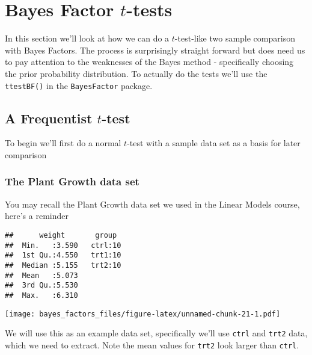 \documentclass[
]{book}
\newenvironment{Shaded}{\begin{snugshade}}{\end{snugshade}}
\newcommand{\KeywordTok}[1]{\textcolor[rgb]{0.13,0.29,0.53}{\textbf{#1}}}
\newcommand{\NormalTok}[1]{#1}
\newcommand{\OperatorTok}[1]{\textcolor[rgb]{0.81,0.36,0.00}{\textbf{#1}}}
\newcommand{\StringTok}[1]{\textcolor[rgb]{0.31,0.60,0.02}{#1}}
\begin{document}
\hypertarget{bayes-factor-t-tests}{%
\chapter{\texorpdfstring{Bayes Factor \(t\)-tests}{Bayes Factor t-tests}}\label{bayes-factor-t-tests}}

In this section we'll look at how we can do a \(t\)-test-like two sample comparison with Bayes Factors. The process is surprisingly straight forward but does need us to pay attention to the weaknesses of the Bayes method - specifically choosing the prior probability distribution. To actually do the tests we'll use the \texttt{ttestBF()} in the \texttt{BayesFactor} package.

\hypertarget{a-frequentist-t-test}{%
\section{\texorpdfstring{A Frequentist \(t\)-test}{A Frequentist t-test}}\label{a-frequentist-t-test}}

To begin we'll first do a normal \(t\)-test with a sample data set as a basis for later comparison

\hypertarget{the-plant-growth-data-set}{%
\subsection{The Plant Growth data set}\label{the-plant-growth-data-set}}

You may recall the Plant Growth data set we used in the Linear Models course, here's a reminder

\begin{verbatim}
##      weight       group   
##  Min.   :3.590   ctrl:10  
##  1st Qu.:4.550   trt1:10  
##  Median :5.155   trt2:10  
##  Mean   :5.073            
##  3rd Qu.:5.530            
##  Max.   :6.310
\end{verbatim}

\texttt{[image: bayes\_factors\_files/figure-latex/unnamed-chunk-21-1.pdf]}

We will use this as an example data set, specifically we'll use \texttt{ctrl} and \texttt{trt2} data, which we need to extract. Note the mean values for \texttt{trt2} look larger than \texttt{ctrl}.

\begin{Shaded}
\end{Shaded}
\end{document}
